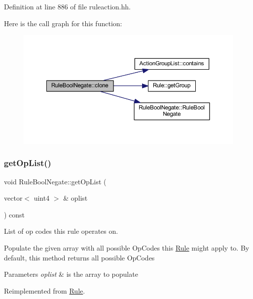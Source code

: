 Definition at line 886 of file ruleaction.\+hh.

Here is the call graph for this function\+:
\nopagebreak
\begin{figure}[H]
\begin{center}
\leavevmode
\includegraphics[width=350pt]{class_rule_bool_negate_a4e69c7e3e7588953be7ba4a9b987dd23_cgraph}
\end{center}
\end{figure}
\mbox{\label{class_rule_bool_negate_ad3d2e02996b281f50f45f0fc830f7a8b}} 
\subsubsection{\texorpdfstring{getOpList()}{getOpList()}}
{\footnotesize\ttfamily void Rule\+Bool\+Negate\+::get\+Op\+List (\begin{DoxyParamCaption}\item[{vector$<$ uint4 $>$ \&}]{oplist }\end{DoxyParamCaption}) const\hspace{0.3cm}{\ttfamily [virtual]}}



List of op codes this rule operates on. 

Populate the given array with all possible Op\+Codes this \mbox{\hyperlink{class_rule}{Rule}} might apply to. By default, this method returns all possible Op\+Codes 
\begin{DoxyParams}{Parameters}
{\em oplist} & is the array to populate \\
\hline
\end{DoxyParams}


Reimplemented from \mbox{\hyperlink{class_rule_a4023bfc7825de0ab866790551856d10e}{Rule}}.



